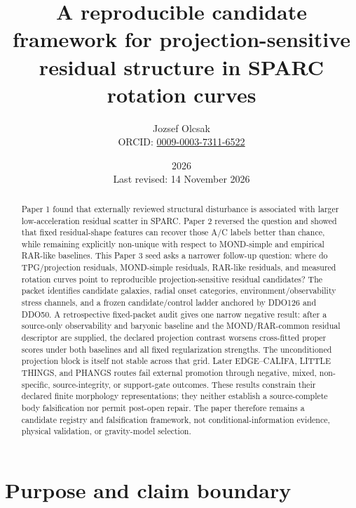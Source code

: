 \documentclass[11pt]{article}
\title{A reproducible candidate framework for projection-sensitive residual structure in SPARC rotation curves}
\author{Jozsef Olcsak\\{\small ORCID: \href{https://orcid.org/0009-0003-7311-6522}{0009-0003-7311-6522}}}
\date{2026\\Last revised: 14 November 2026}
\begin{document}
\maketitle

\begin{abstract}
Paper 1 found that externally reviewed structural disturbance is associated with larger low-acceleration residual scatter in SPARC. Paper 2 reversed the question and showed that fixed residual-shape features can recover those A/C labels better than chance, while remaining explicitly non-unique with respect to MOND-simple and empirical RAR-like baselines. This Paper 3 seed asks a narrower follow-up question: where do TPG/projection residuals, MOND-simple residuals, RAR-like residuals, and measured rotation curves point to reproducible projection-sensitive residual candidates? The packet identifies candidate galaxies, radial onset categories, environment/observability stress channels, and a frozen candidate/control ladder anchored by DDO126 and DDO50. A retrospective fixed-packet audit gives one narrow negative result: after a source-only observability and baryonic baseline and the MOND/RAR-common residual descriptor are supplied, the declared projection contrast worsens cross-fitted proper scores under both baselines and all fixed regularization strengths. The unconditioned projection block is itself not stable across that grid. Later EDGE--CALIFA, LITTLE THINGS, and PHANGS routes fail external promotion through negative, mixed, non-specific, source-integrity, or support-gate outcomes. These results constrain their declared finite morphology representations; they neither establish a source-complete body falsification nor permit post-open repair. The paper therefore remains a candidate registry and falsification framework, not conditional-information evidence, physical validation, or gravity-model selection.
\end{abstract}

\section{Purpose and claim boundary}
\end{document}
